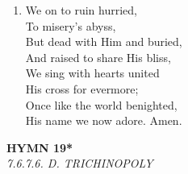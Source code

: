 \documentclass[11pt,a4paper]{article}
\begin{document}
\begin{enumerate}
    \item We on to ruin hurried, \\
        To misery's abyss, \\
        But dead with Him and buried, \\
        And raised to share His bliss, \\
        We sing with hearts united \\
        His cross for evermore; \\
        Once like the world benighted, \\
        His name we now adore. Amen.

\end{enumerate}

\newpage
\begin{center}
    {\Large \textbf{HYMN 19*}}
    \\
    \textit{7.6.7.6. D. TRICHINOPOLY}
\end{center}
\vspace{1em}
\end{document}

